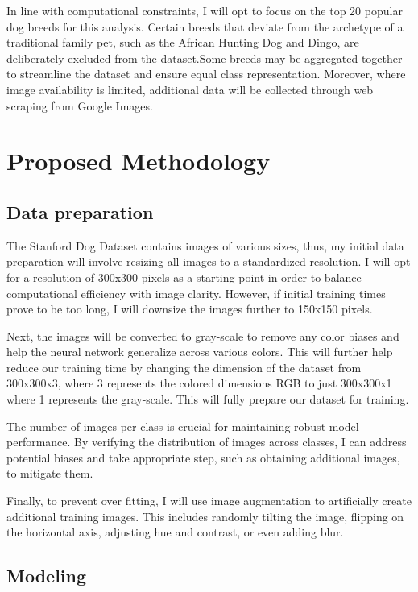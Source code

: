 \documentclass[11pt]{article}
\begin{document}
In line with computational constraints, I will opt to focus on the top 20 popular dog breeds for this analysis. Certain breeds that deviate from the archetype of a traditional family pet, such as the African Hunting Dog and Dingo, are deliberately excluded from the dataset.Some breeds may be aggregated together to streamline the dataset and ensure equal class representation. Moreover, where image availability is limited, additional data will be collected through web scraping from Google Images.

\section{Proposed Methodology}

\subsection{Data preparation}  

The Stanford Dog Dataset contains images of various sizes, thus, my initial data preparation will involve resizing all images to a standardized resolution. I will opt for a resolution of 300x300 pixels as a starting point in order to balance computational efficiency with image clarity. However, if initial training times prove to be too long, I will downsize the images further to 150x150 pixels.

Next, the images will be converted to gray-scale to remove any color biases and help the neural network generalize across various colors. This will further help reduce our training time by changing the dimension of the dataset from 300x300x3, where 3 represents the colored dimensions RGB to just 300x300x1 where 1 represents the gray-scale. This will fully prepare our dataset for training.   

The number of images per class is crucial for maintaining robust model performance. By verifying the distribution of images across classes, I can address potential biases and take appropriate step, such as obtaining additional images, to mitigate them. 

Finally, to prevent over fitting, I will use image augmentation to artificially create additional training images. This includes randomly tilting the image, flipping on the horizontal axis, adjusting hue and contrast, or even adding blur. 

\subsection{Modeling}
\end{document}
